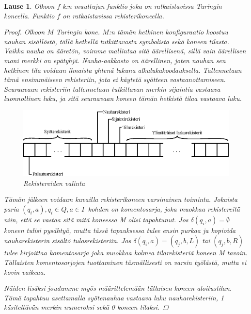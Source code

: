 \documentclass[a4paper, 12pt]{article}
\theoremstyle{definition}
\theoremstyle{plain}
\newtheorem{teor}[mydef]{Lause}
\begin{document}
\begin{teor}
Olkoon $f$ k:n muuttujan funktio joka on ratkaistavissa Turingin koneella. Funktio $f$ on ratkaistavissa rekisterikoneella.
\begin{proof}
Olkoon $M$ Turingin kone. $M$:n tämän hetkinen konfiguraatio koostuu nauhan sisällöstä, tällä hetkellä tutkittavasta symbolista sekä koneen tilasta. Vaikka nauha on ääretön, voimme mallintaa sitä äärellisenä, sillä vain äärellisen moni merkki on epätyhjä. Nauha-aakkosto on äärellinen, joten nauhan sen hetkinen tila voidaan ilmaista yhtenä lukuna alkulukukoodauksella. Tallennetaan tämä ensimmäiseen rekisteriin, jota ei käytetä syötteen vastaanottamiseen. Seuraavaan rekisteriin tallennetaan tutkittavan merkin sijaintia vastaava luonnollinen luku, ja sitä seuraavaan koneen tämän hetkistä tilaa vastaava luku.
\begin{figure}[H]
\centering
\includegraphics{graph5.eps}
\caption{Rekistereiden valinta}
\end{figure}
Tämän jälkeen voidaan kuvailla rekisterikoneen varsinainen toiminta. Jokaista paria $(q_i, a), q_i \in Q, a \in \Gamma$ kohden on komentosarja, joka muokkaa rekistereitä niin, että se vastaa sitä mitä koneessa M olisi tapahtunut. Jos $\delta(q_i, a) = \emptyset$ koneen tulisi pysähtyä, mutta tässä tapauksessa tulee ensin purkaa ja kopioida nauharekisterin sisältö tulosrekisteriin. Jos $\delta(q_i, a) = (q_j, b, L)$ tai $(q_j, b, R)$ tulee kirjoittaa komentosarja joka muokkaa kolmea tilarekisteriä koneen M tavoin. Tällaisten komentosarjojen tuottaminen täsmällisesti on varsin työlästä, mutta ei kovin vaikeaa.

Näiden lisäksi joudumme myös määrittelemään tällaisen koneen aloitustilan. Tämä tapahtuu asettamalla syötenauhaa vastaava luku nauharekisteriin, 1 käsiteltävän merkin numeroksi sekä 0 koneen tilaksi.

\qedhere
\end{proof}
\end{teor}
\end{document}
